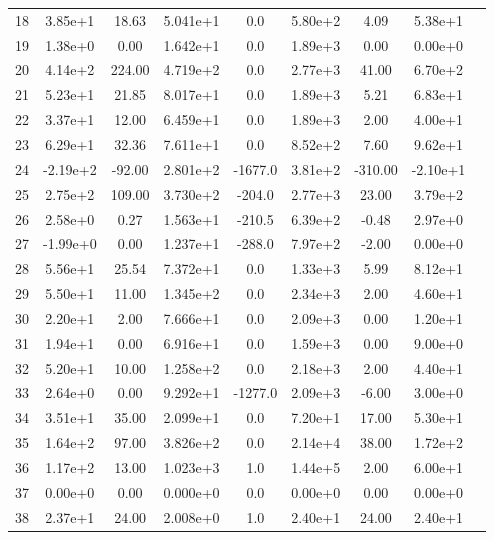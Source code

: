 \documentclass[11pt]{article}
\begin{document}
\begin{table}[H]
{\begin{tabular}{|c|c|c|c|c|c|c|c|c|}
    18   & 3.85e+1&      18.63&  5.041e+1&     0.0&  5.80e+2&      4.09&  5.38e+1 \\
    19   & 1.38e+0&       0.00&  1.642e+1&     0.0&  1.89e+3&      0.00&  0.00e+0 \\
    20   & 4.14e+2&     224.00&  4.719e+2&     0.0&  2.77e+3&     41.00&  6.70e+2 \\
    21   & 5.23e+1&      21.85&  8.017e+1&     0.0&  1.89e+3&      5.21&  6.83e+1 \\
    22   & 3.37e+1&      12.00&  6.459e+1&     0.0&  1.89e+3&      2.00&  4.00e+1 \\
    23   & 6.29e+1&      32.36&  7.611e+1&     0.0&  8.52e+2&      7.60&  9.62e+1 \\
    24   &-2.19e+2&     -92.00&  2.801e+2& -1677.0&  3.81e+2&   -310.00& -2.10e+1 \\
    25   & 2.75e+2&     109.00&  3.730e+2&  -204.0&  2.77e+3&     23.00&  3.79e+2 \\
    26   & 2.58e+0&       0.27&  1.563e+1&  -210.5&  6.39e+2&     -0.48&  2.97e+0 \\
    27   &-1.99e+0&       0.00&  1.237e+1&  -288.0&  7.97e+2&     -2.00&  0.00e+0 \\
    28   & 5.56e+1&      25.54&  7.372e+1&     0.0&  1.33e+3&      5.99&  8.12e+1 \\
    29   & 5.50e+1&      11.00&  1.345e+2&     0.0&  2.34e+3&      2.00&  4.60e+1 \\
    30   & 2.20e+1&       2.00&  7.666e+1&     0.0&  2.09e+3&      0.00&  1.20e+1 \\
    31   & 1.94e+1&       0.00&  6.916e+1&     0.0&  1.59e+3&      0.00&  9.00e+0 \\
    32   & 5.20e+1&      10.00&  1.258e+2&     0.0&  2.18e+3&      2.00&  4.40e+1 \\
    33   & 2.64e+0&       0.00&  9.292e+1& -1277.0&  2.09e+3&     -6.00&  3.00e+0 \\
    34   & 3.51e+1&      35.00&  2.099e+1&     0.0&  7.20e+1&     17.00&  5.30e+1 \\
    35   & 1.64e+2&      97.00&  3.826e+2&     0.0&  2.14e+4&     38.00&  1.72e+2 \\
    36   & 1.17e+2&      13.00&  1.023e+3&     1.0&  1.44e+5&      2.00&  6.00e+1 \\
    37   & 0.00e+0&       0.00&  0.000e+0&     0.0&  0.00e+0&      0.00&  0.00e+0 \\
    38   & 2.37e+1&      24.00&  2.008e+0&     1.0&  2.40e+1&     24.00&  2.40e+1 \\

\end{tabular}}
\end{table}
\end{document}
